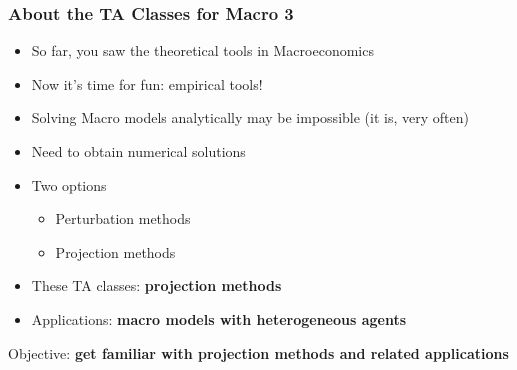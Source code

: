 \documentclass[10pt, aspectratio=1610]{beamer}
\begin{document}
  \begin{frame}
    \frametitle{About the TA Classes for Macro 3}

    \begin{itemize}
      \item So far, you saw the theoretical tools in Macroeconomics
      \item Now it's time for fun: empirical tools!
    \end{itemize}

    \vfill\pause

    \begin{itemize}
      \item Solving Macro models analytically may be impossible (it is, very often)
      \item Need to obtain numerical solutions
      \item Two options
        \begin{itemize}
          \item Perturbation methods
          \item Projection methods
        \end{itemize}
    \end{itemize}

    \vfill\pause

    \begin{itemize}
      \item These TA classes: \textbf{projection methods}
      \item Applications: \textbf{macro models with heterogeneous agents}
    \end{itemize}

    \vfill\pause

    Objective: \textbf{get familiar with projection methods and related applications}

  \end{frame}
\end{document}
